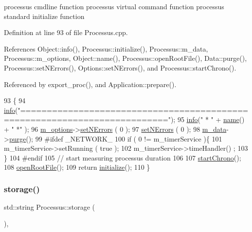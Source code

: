 processus cmdline function processus virtual command function processus standard initialize function 

Definition at line 93 of file Processus.\+cpp.



References Object\+::info(), Processus\+::initialize(), Processus\+::m\+\_\+data, Processus\+::m\+\_\+options, Object\+::name(), Processus\+::open\+Root\+File(), Data\+::purge(), Processus\+::set\+N\+Errors(), Options\+::set\+N\+Errors(), and Processus\+::start\+Chrono().



Referenced by export\+\_\+proc(), and Application\+::prepare().


\begin{DoxyCode}
93                                       \{
94   \hyperlink{classObject_a644fd329ea4cb85f54fa6846484b84a8}{info}(\textcolor{stringliteral}{"=========================================================================="});
95   \hyperlink{classObject_a644fd329ea4cb85f54fa6846484b84a8}{info}(\textcolor{stringliteral}{"   * "} + \hyperlink{classObject_a300f4c05dd468c7bb8b3c968868443c1}{name}() + \textcolor{stringliteral}{" *"} );
96   \hyperlink{classProcessus_a74205f3c1e00c4448f7b3257c2351797}{m\_options}->\hyperlink{classOptions_a45368b495036869c67fe0e6bf9abc4e6}{setNErrors} ( 0 );
97   \hyperlink{classProcessus_a831b027b9cf18ab56fa6147b5d3055da}{setNErrors} ( 0 );
98   \hyperlink{classProcessus_a3da9a9de8af54e2f47807a3e09dfccff}{m\_data}->\hyperlink{classData_a26209d56fdc86a72ae391fcd3bd2adfd}{purge}();
99 \textcolor{preprocessor}{#ifdef \_NETWORK\_}
100   \textcolor{keywordflow}{if} ( 0 != m\_timerService )\{
101     m\_timerService->setRunning ( \textcolor{keyword}{true} );
102     m\_timerService->timeHandler() ;
103   \}
104 \textcolor{preprocessor}{#endif}
105   \textcolor{comment}{// start measuring processus duration}
106   
107   \hyperlink{classProcessus_a5e4d34b86241fa0756e07375a14ff4b2}{startChrono}();
108   \hyperlink{classProcessus_aacf6812880c1d1a2bf14a4a39458f443}{openRootFile}();
109   \textcolor{keywordflow}{return} \hyperlink{classProcessus_aee88ad7b77ae7319cf8b128e9dd2ea11}{initialize}();
110 \}
\end{DoxyCode}
\mbox{\label{classProcessus_a33fa1a0b54a636e5cdd680669fd9ea51}} 
\subsubsection{\texorpdfstring{storage()}{storage()}}
{\footnotesize\ttfamily std\+::string Processus\+::storage (\begin{DoxyParamCaption}{ }\end{DoxyParamCaption})\hspace{0.3cm}{\ttfamily [inline]}, {\ttfamily [inherited]}}

